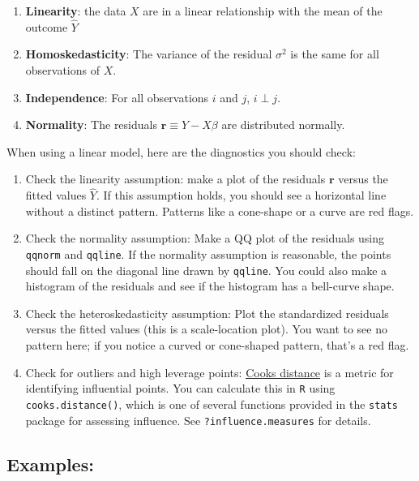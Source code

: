 \documentclass[
]{book}
\begin{document}
\begin{enumerate}
\def\labelenumi{\arabic{enumi}.}
\item
  \textbf{Linearity}: the data \(X\) are in a linear relationship with the mean of the outcome \(\hat Y\)
\item
  \textbf{Homoskedasticity}: The variance of the residual \(\sigma^2\) is the same for all observations of \(X\).
\item
  \textbf{Independence}: For all observations \(i\) and \(j\), \(i \perp j\).
\item
  \textbf{Normality}: The residuals \(\textbf{r} \equiv Y - X\beta\) are distributed normally.
\end{enumerate}

When using a linear model, here are the diagnostics you should check:

\begin{enumerate}
\def\labelenumi{\arabic{enumi}.}
\item
  Check the linearity assumption: make a plot of the residuals \(\textbf{r}\) versus the fitted values \(\hat Y\). If this assumption holds, you should see a horizontal line without a distinct pattern. Patterns like a cone-shape or a curve are red flags.
\item
  Check the normality assumption: Make a QQ plot of the residuals using \texttt{qqnorm} and \texttt{qqline}. If the normality assumption is reasonable, the points should fall on the diagonal line drawn by \texttt{qqline}. You could also make a histogram of the residuals and see if the histogram has a bell-curve shape.
\item
  Check the heteroskedasticity assumption: Plot the standardized residuals versus the fitted values (this is a scale-location plot). You want to see no pattern here; if you notice a curved or cone-shaped pattern, that's a red flag.
\item
  Check for outliers and high leverage points: \href{https://en.wikipedia.org/wiki/Cook\%27s_distance}{Cooks distance} is a metric for identifying influential points. You can calculate this in \texttt{R} using \texttt{cooks.distance()}, which is one of several functions provided in the \texttt{stats} package for assessing influence. See \texttt{?influence.measures} for details.
\end{enumerate}

\hypertarget{examples-1}{%
\subsection{Examples:}\label{examples-1}}
\end{document}
